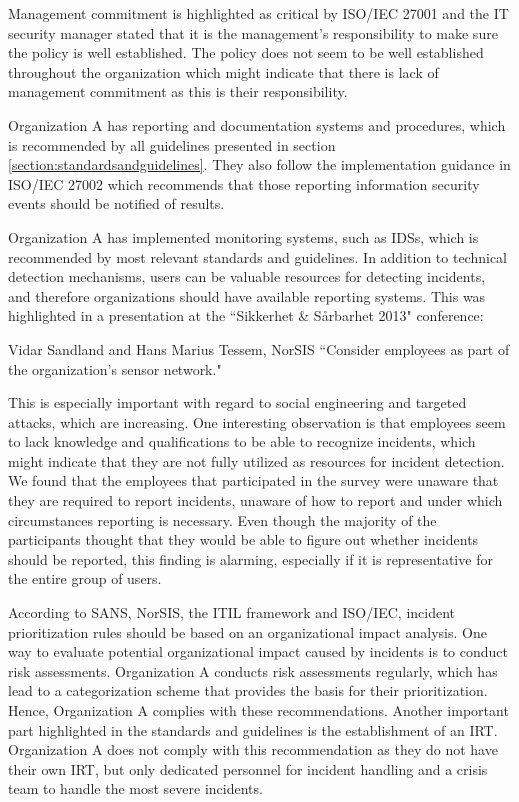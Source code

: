 Management commitment is highlighted as critical by ISO/IEC 27001 and the IT security manager stated that it is the management's responsibility to make sure the policy is well established. The policy does not seem to be well established throughout the organization which might indicate that there is lack of management commitment as this is their responsibility.

Organization A has reporting and documentation systems and procedures, which is recommended by all guidelines presented in section \ref{section:standardsandguidelines}. They also follow the implementation guidance in ISO/IEC 27002 which recommends that those reporting information security events should be notified of results. 

Organization  A has implemented monitoring systems, such as IDSs, which is recommended by most relevant standards and guidelines. In addition to technical detection mechanisms, users can be valuable resources for detecting incidents, and therefore organizations should have available reporting systems. This was highlighted in a presentation at the ``Sikkerhet \& S\aa rbarhet 2013" conference:

\begin{newquote}{Vidar Sandland and Hans Marius Tessem, NorSIS}
``Consider employees as part of the organization's sensor network."
\end{newquote}

This is especially important with regard to social engineering and targeted attacks, which are increasing. One interesting observation is that employees seem to lack knowledge and qualifications to be able to recognize incidents, which might indicate that they are not fully utilized as resources for incident detection. We found that the employees that participated in the survey were unaware that they are required to report incidents, unaware of how to report and under which circumstances reporting is necessary. Even though the majority of the participants thought that they would be able to figure out whether incidents should be reported, this finding is alarming, especially if it is representative for the entire group of users. 

According to SANS, NorSIS, the ITIL framework and ISO/IEC, incident prioritization rules should be based on an organizational impact analysis. One way to evaluate potential organizational impact caused by incidents is to conduct risk assessments. Organization A conducts risk assessments regularly, which has lead to a categorization scheme that provides the basis for their prioritization. Hence, Organization A complies with these recommendations. Another important part highlighted in the standards and guidelines is the establishment of an \ac{IRT}. Organization A does not comply with this recommendation as they do not have their own \ac{IRT}, but only dedicated personnel for incident handling and a crisis team to handle the most severe incidents.

